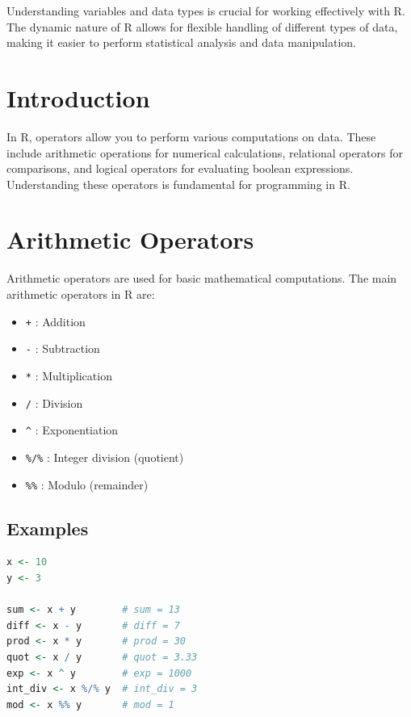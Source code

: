 \documentclass[10pt]{book}
\begin{document}
Understanding variables and data types is crucial for working effectively with R. The dynamic nature of R allows for flexible handling of different types of data, making it easier to perform statistical analysis and data manipulation.







\section{Introduction}
In R, operators allow you to perform various computations on data. These include arithmetic operations for numerical calculations, relational operators for comparisons, and logical operators for evaluating boolean expressions. Understanding these operators is fundamental for programming in R.

\section{Arithmetic Operators}
Arithmetic operators are used for basic mathematical computations. The main arithmetic operators in R are:
\begin{itemize}
    \item \texttt{+} : Addition
    \item \texttt{-} : Subtraction
    \item \texttt{*} : Multiplication
    \item \texttt{/} : Division
    \item \texttt{\^} : Exponentiation
    \item \texttt{\%/\%} : Integer division (quotient)
    \item \texttt{\%\%} : Modulo (remainder)
\end{itemize}



\subsection{Examples}
\begin{lstlisting}[language=R]
x <- 10
y <- 3

sum <- x + y        # sum = 13
diff <- x - y       # diff = 7
prod <- x * y       # prod = 30
quot <- x / y       # quot = 3.33
exp <- x ^ y        # exp = 1000
int_div <- x %/% y  # int_div = 3
mod <- x %% y       # mod = 1
\end{lstlisting}
\end{document}
